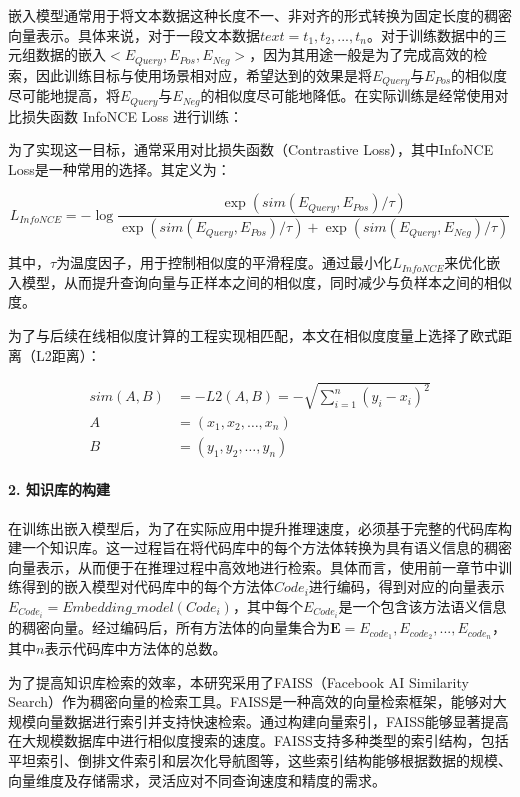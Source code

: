 嵌入模型通常用于将文本数据这种长度不一、非对齐的形式转换为固定长度的稠密向量表示。具体来说，对于一段文本数据$text={t_1, t_2, ..., t_n}$。对于训练数据中的三元组数据的嵌入$<E_{Query},E_{Pos},E_{Neg}>$，因为其用途一般是为了完成高效的检索，因此训练目标与使用场景相对应，希望达到的效果是将$E_{Query}$与$E_{Pos}$的相似度尽可能地提高，将$E_{Query}$与$E_{Neg}$的相似度尽可能地降低。在实际训练是经常使用对比损失函数 InfoNCE Loss 进行训练：

为了实现这一目标，通常采用对比损失函数（Contrastive Loss），其中InfoNCE Loss是一种常用的选择。其定义为：

\begin{equation}
    L_{InfoNCE} = -\log\frac{\exp(sim(E_{Query}, E_{Pos}) / \tau)}{\exp(sim(E_{Query}, E_{Pos}) / \tau)+\exp(sim(E_{Query}, E_{Neg}) / \tau)}
\end{equation}

其中，$\tau$为温度因子，用于控制相似度的平滑程度。通过最小化$L_{InfoNCE}$来优化嵌入模型，从而提升查询向量与正样本之间的相似度，同时减少与负样本之间的相似度。

为了与后续在线相似度计算的工程实现相匹配，本文在相似度度量上选择了欧式距离（L2距离）：

\begin{align}
sim(A,B)&=-L2(A, B)  = -\sqrt{\sum_{i=1}^{n} (y_i - x_i)^2} \\
A &= (x_1, x_2, \dots, x_n) \\
B &= (y_1, y_2, \dots, y_n)
\end{align}

\paragraph{2. 知识库的构建}

在训练出嵌入模型后，为了在实际应用中提升推理速度，必须基于完整的代码库构建一个知识库。这一过程旨在将代码库中的每个方法体转换为具有语义信息的稠密向量表示，从而便于在推理过程中高效地进行检索。具体而言，使用前一章节中训练得到的嵌入模型对代码库中的每个方法体$Code_i$进行编码，得到对应的向量表示$E_{Code_i}=Embedding\_model(Code_i)$，其中每个$E_{Code_i}$是一个包含该方法语义信息的稠密向量。经过编码后，所有方法体的向量集合为$\mathbf{E}={E_{code_1}, E_{code_2}, ..., E_{code_n}}$，其中$n$表示代码库中方法体的总数。

为了提高知识库检索的效率，本研究采用了FAISS（Facebook AI Similarity Search）作为稠密向量的检索工具。FAISS是一种高效的向量检索框架，能够对大规模向量数据进行索引并支持快速检索。通过构建向量索引，FAISS能够显著提高在大规模数据库中进行相似度搜索的速度。FAISS支持多种类型的索引结构，包括平坦索引、倒排文件索引和层次化导航图等，这些索引结构能够根据数据的规模、向量维度及存储需求，灵活应对不同查询速度和精度的需求。

